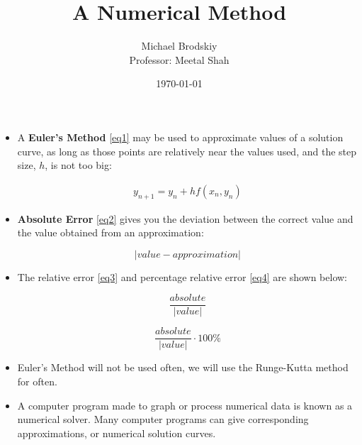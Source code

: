 \documentclass[12pt]{article}
\title{A Numerical Method}
\date{\today}
\author{Michael Brodskiy\\ \small Professor: Meetal Shah}
\begin{document}
\maketitle

\begin{itemize}

  \item A \textbf{Euler's Method} \eqref{eq1} may be used to approximate values of a solution curve, as long as those points are relatively near the values used, and the step size, $h$, is not too big:

    \begin{equation}
      \begin{split}
        y_{n+1}=y_n + hf(x_n,y_n)
      \end{split}
      \label{eq1}
    \end{equation}

  \item \textbf{Absolute Error} \eqref{eq2} gives you the deviation between the correct value and the value obtained from an approximation:

    \begin{equation}
      | value - approximation|
      \label{eq2}
    \end{equation}

  \item The relative error \eqref{eq3} and percentage relative error \eqref{eq4} are shown below:

    \begin{equation}
      \frac{absolute}{|value|}
      \label{eq3}
    \end{equation}

    \begin{equation}
      \frac{absolute}{|value|}\cdot 100\%
      \label{eq4}
    \end{equation}

  \item Euler's Method will not be used often, we will use the Runge-Kutta method for often.

  \item A computer program made to graph or process numerical data is known as a numerical solver. Many computer programs can give corresponding approximations, or numerical solution curves.


\end{itemize}
\end{document}
